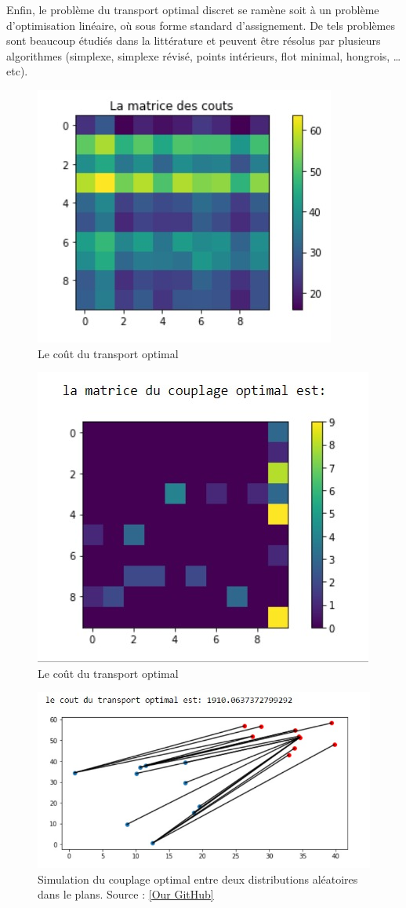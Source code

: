 \documentclass[
    8.2pt,
    a4paper,
    logo,
    twocolumn
]{template}
\begin{document}
    Enfin, le problème du transport optimal discret se ramène soit à un problème d'optimisation linéaire, où sous forme standard d'assignement. De tels problèmes sont beaucoup étudiés dans la littérature et peuvent être résolus par plusieurs algorithmes (simplexe, simplexe révisé, points intérieurs, flot minimal, hongrois, \dots etc).
    \begin{figure}
        \centering
        \includegraphics[width=.5\textwidth]{figures/image7.jpg}
        \caption{Le coût du transport optimal}
        \label{fig:my_label}
    \end{figure}
        \begin{figure}
        \centering
        \includegraphics[width=.5\textwidth]{figures/image8.jpg}
        \caption{Le coût du transport optimal}
        \label{fig:my_label}
    \end{figure}
    \begin{figure}[H]
        \centering
        \includegraphics[width=.5\textwidth]{figures/image9.jpg}
        \caption{Simulation du couplage optimal entre deux distributions aléatoires dans le plans. Source : \href{https://github.com/maranibadr/tranport-optimal/blob/master/notebooks/TO_simulation_transport.ipynb}{[Our GitHub]}}
        \label{fig:my_label}
    \end{figure}
\end{document}
